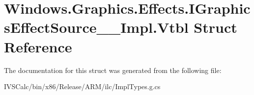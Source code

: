 \hypertarget{struct_windows_1_1_graphics_1_1_effects_1_1_i_graphics_effect_source_____impl_1_1_vtbl}{}\section{Windows.\+Graphics.\+Effects.\+I\+Graphics\+Effect\+Source\+\_\+\+\_\+\+Impl.\+Vtbl Struct Reference}
\label{struct_windows_1_1_graphics_1_1_effects_1_1_i_graphics_effect_source_____impl_1_1_vtbl}


The documentation for this struct was generated from the following file\+:\begin{DoxyCompactItemize}
\item 
I\+V\+S\+Calc/bin/x86/\+Release/\+A\+R\+M/ilc/Impl\+Types.\+g.\+cs\end{DoxyCompactItemize}
